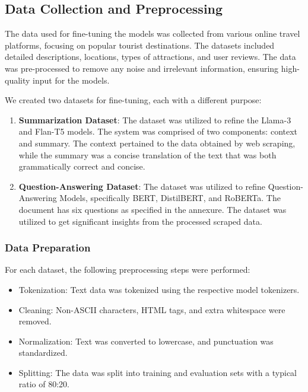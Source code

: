 \documentclass[conference]{IEEEtran}
\begin{document}
    \subsection{Data Collection and Preprocessing}

        The data used for fine-tuning the models was collected from various online travel platforms, focusing on popular tourist destinations. The datasets included detailed descriptions, locations, types of attractions, and user reviews. The data was pre-processed to remove any noise and irrelevant information, ensuring high-quality input for the models.

        We created two datasets for fine-tuning, each with a different purpose:

        \begin{enumerate}
            \item \textbf{Summarization Dataset}: The dataset was utilized to refine the Llama-3 and Flan-T5 models. The system was comprised of two components: context and summary. The context pertained to the data obtained by web scraping, while the summary was a concise translation of the text that was both grammatically correct and concise.
            \item \textbf{Question-Answering Dataset}: The dataset was utilized to refine Question-Answering Models, specifically BERT, DistilBERT, and RoBERTa. The document has six questions as specified in the annexure. The dataset was utilized to get significant insights from the processed scraped data.
        \end{enumerate}

        \subsubsection{Data Preparation}

            For each dataset, the following preprocessing steps were performed:
            \begin{itemize}
                \item Tokenization: Text data was tokenized using the respective model tokenizers.
                \item Cleaning: Non-ASCII characters, HTML tags, and extra whitespace were removed.
                \item Normalization: Text was converted to lowercase, and punctuation was standardized.
                \item Splitting: The data was split into training and evaluation sets with a typical ratio of 80:20.
            \end{itemize}
\end{document}
